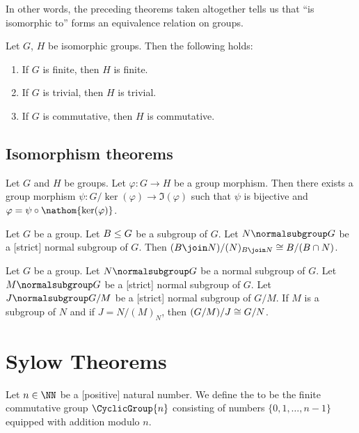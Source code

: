 In other words, the preceding theorems taken altogether tells us that
``is isomorphic to'' forms an equivalence relation on groups.

\begin{theorem}
Let $G$, $H$ be isomorphic groups. Then the following holds:
\begin{enumerate}
\item{} If $G$ is finite, then $H$ is finite.
\item{} If $G$ is trivial, then $H$ is trivial.
\item{} If $G$ is commutative, then $H$ is commutative.
\end{enumerate}
\end{theorem}

\subsection{Isomorphism theorems}

\begin{theorem}
Let $G$ and $H$ be groups.
Let $\varphi\colon G\to H$ be a group morphism.
Then there exists a group morphism $\psi\colon G/\ker(\varphi)\to\Im(\varphi)$
such that $\psi$ is bijective and $\varphi=\psi\circ\nathom{\ker(\varphi)}$.
\end{theorem}

\begin{theorem}
Let $G$ be a group. Let $B\leq G$ be a subgroup of $G$.
Let $N\normalsubgroup G$ be a [strict] normal subgroup of $G$.
Then $(B\join N)/(N)_{B\join N}\iso B/(B\cap N)$.
\end{theorem}

\begin{theorem}
Let $G$ be a group.
Let $N\normalsubgroup G$ be a normal subgroup of $G$.
Let $M\normalsubgroup G$ be a [strict] normal subgroup of $G$.
Let $J\normalsubgroup G/M$ be a [strict] normal subgroup of $G/M$.
If $M$ is a subgroup of $N$ and if $J=N/(M)_{N}$, then $(G/M)/J\cong G/N$.
\end{theorem}

\section{Sylow Theorems}

\begin{definition}
Let $n\in\NN$ be a [positive] natural number.
We define the  to be the finite
commutative group
$\CyclicGroup{n}$ consisting of numbers $\{0,1,\dots,n-1\}$ equipped
with addition modulo $n$.
\end{definition}

